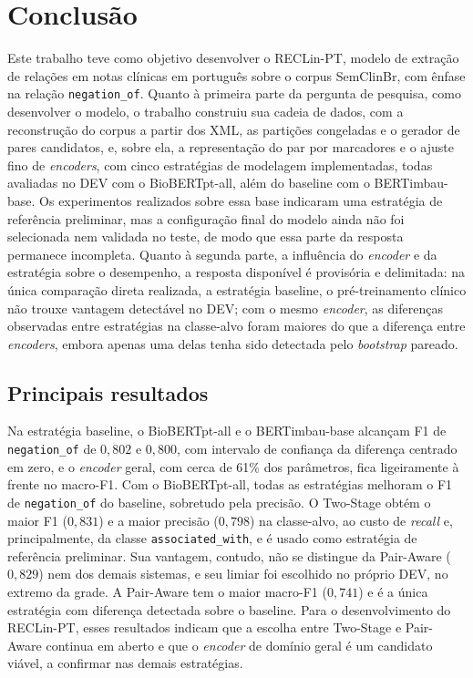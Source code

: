 \chapter[Conclusão]{Conclusão}
\label{cap:conclusao}

Este trabalho teve como objetivo desenvolver o RECLin-PT, modelo de extração de
relações em notas clínicas em português sobre o corpus SemClinBr, com ênfase na
relação \texttt{negation\_of}. Quanto à primeira parte da pergunta de pesquisa, como
desenvolver o modelo, o trabalho construiu sua cadeia de dados, com a reconstrução do
corpus a partir dos XML, as partições congeladas e o gerador de pares candidatos, e,
sobre ela, a representação do par por marcadores e o ajuste fino de \emph{encoders},
com cinco estratégias de modelagem implementadas, todas avaliadas no DEV com o
BioBERTpt-all, além do baseline com o BERTimbau-base. Os experimentos realizados
sobre essa base indicaram uma estratégia de referência preliminar, mas a configuração
final do modelo ainda não foi selecionada nem validada no teste, de modo que essa
parte da resposta permanece incompleta. Quanto à segunda parte, a influência do
\emph{encoder} e da estratégia sobre o desempenho, a resposta disponível é
provisória e delimitada: na única comparação direta realizada, a estratégia baseline, o
pré-treinamento clínico não trouxe vantagem detectável no DEV; com o mesmo
\emph{encoder}, as diferenças observadas entre estratégias na classe-alvo foram
maiores do que a diferença entre \emph{encoders}, embora apenas uma delas tenha sido
detectada pelo \emph{bootstrap} pareado.

\section{Principais resultados}

Na estratégia baseline, o BioBERTpt-all e o BERTimbau-base alcançam F1 de
\texttt{negation\_of} de $0{,}802$ e $0{,}800$, com intervalo de confiança da
diferença centrado em zero, e o \emph{encoder} geral, com cerca de 61\% dos
parâmetros, fica ligeiramente à frente no macro-F1. Com o BioBERTpt-all, todas as
estratégias melhoram o F1 de \texttt{negation\_of} do baseline, sobretudo pela
precisão. O Two-Stage obtém o maior F1 ($0{,}831$) e a maior precisão ($0{,}798$) na
classe-alvo, ao custo de \emph{recall} e, principalmente, da classe
\texttt{associated\_with}, e é usado como estratégia de referência preliminar. Sua
vantagem, contudo, não se distingue da Pair-Aware ($0{,}829$) nem dos demais sistemas,
e seu limiar foi escolhido no próprio DEV, no extremo da grade. A Pair-Aware tem o
maior macro-F1 ($0{,}741$) e é a única estratégia com diferença detectada sobre o
baseline. Para o desenvolvimento do RECLin-PT, esses resultados indicam que a escolha
entre Two-Stage e Pair-Aware continua em aberto e que o \emph{encoder} de domínio
geral é um candidato viável, a confirmar nas demais estratégias.

